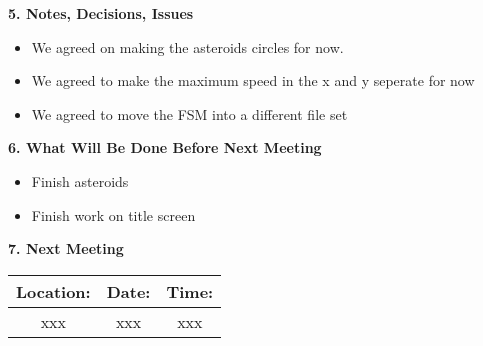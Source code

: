 \documentclass[12pt]{article}
\begin{document}
\begin{flushleft}
\textbf{5. Notes, Decisions, Issues}\\
\begin{itemize}
\item We agreed on making the asteroids circles for now.
\item We agreed to make the maximum speed in the x and y seperate for now
\item We agreed to move the FSM into a different file set
\end{itemize}


\textbf{6. What Will Be Done Before Next Meeting}\\
\begin{itemize}
\item Finish asteroids
\item Finish work on title screen
\end{itemize}

\textbf{7. Next Meeting}\\
\begin{center}
 \begin{tabular}{|c | c | c |} 
\hline
 Location: & Date: & Time: \\ 
 \hline
 xxx & xxx & xxx\\
\hline
\end{tabular}
\end{center}

\end{flushleft}
\end{document}
